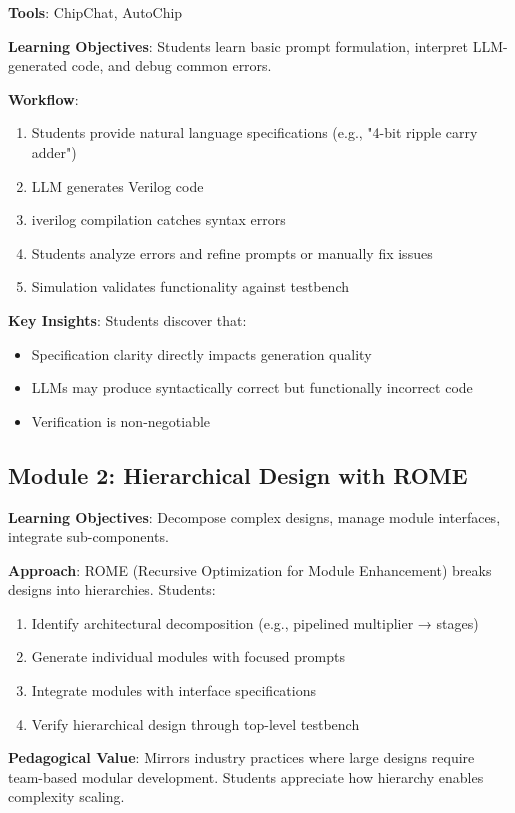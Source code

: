 \documentclass[10pt,conference]{IEEEtran}
\begin{document}
\textbf{Tools}: ChipChat, AutoChip

\textbf{Learning Objectives}: Students learn basic prompt formulation, interpret LLM-generated code, and debug common errors.

\textbf{Workflow}:
\begin{enumerate}
    \item Students provide natural language specifications (e.g., "4-bit ripple carry adder")
    \item LLM generates Verilog code
    \item iverilog compilation catches syntax errors
    \item Students analyze errors and refine prompts or manually fix issues
    \item Simulation validates functionality against testbench
\end{enumerate}

\textbf{Key Insights}: Students discover that:
\begin{itemize}
    \item Specification clarity directly impacts generation quality
    \item LLMs may produce syntactically correct but functionally incorrect code
    \item Verification is non-negotiable
\end{itemize}

\subsection{Module 2: Hierarchical Design with ROME}

\textbf{Learning Objectives}: Decompose complex designs, manage module interfaces, integrate sub-components.

\textbf{Approach}: ROME (Recursive Optimization for Module Enhancement) breaks designs into hierarchies. Students:
\begin{enumerate}
    \item Identify architectural decomposition (e.g., pipelined multiplier → stages)
    \item Generate individual modules with focused prompts
    \item Integrate modules with interface specifications
    \item Verify hierarchical design through top-level testbench
\end{enumerate}

\textbf{Pedagogical Value}: Mirrors industry practices where large designs require team-based modular development. Students appreciate how hierarchy enables complexity scaling.
\end{document}
